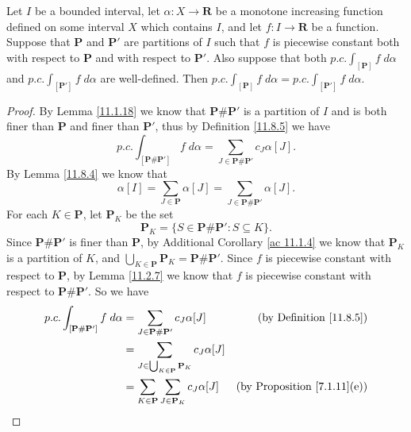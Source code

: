 \begin{additional corollary}\label{ac 11.8.4}
Let \(I\) be a bounded interval, let \(\alpha : X \to \mathbf{R}\) be a monotone increasing function defined on some interval \(X\) which contains \(I\), and let \(f : I \to \mathbf{R}\) be a function.
Suppose that \(\mathbf{P}\) and \(\mathbf{P}'\) are partitions of \(I\) such that \(f\) is piecewise constant both with respect to \(\mathbf{P}\) and with respect to \(\mathbf{P}'\).
Also suppose that both \(p.c. \int_{[\mathbf{P}]} f \; d \alpha\) and \(p.c. \int_{[\mathbf{P}']} f \; d \alpha\) are well-defined.
Then \(p.c. \int_{[\mathbf{P}]} f \; d \alpha = p.c. \int_{[\mathbf{P}']} f \; d \alpha\).
\end{additional corollary}

\begin{proof}
    By Lemma \ref{11.1.18} we know that \(\mathbf{P} \# \mathbf{P}'\) is a partition of \(I\) and is both finer than \(\mathbf{P}\) and finer than \(\mathbf{P}'\), thus by Definition \ref{11.8.5} we have
    \[
        p.c. \int_{[\mathbf{P} \# \mathbf{P}']} f \; d \alpha = \sum_{J \in \mathbf{P} \# \mathbf{P}'} c_J \alpha[J].
    \]
    By Lemma \ref{11.8.4} we know that
    \[
        \alpha[I] = \sum_{J \in \mathbf{P}} \alpha[J] = \sum_{J \in \mathbf{P} \# \mathbf{P}'} \alpha[J].
    \]
    For each \(K \in \mathbf{P}\), let \(\mathbf{P}_K\) be the set
    \[
        \mathbf{P}_K = \{S \in \mathbf{P} \# \mathbf{P}' : S \subseteq K\}.
    \]
    Since \(\mathbf{P} \# \mathbf{P}'\) is finer than \(\mathbf{P}\), by Additional Corollary \ref{ac 11.1.4} we know that \(\mathbf{P}_K\) is a partition of \(K\), and \(\bigcup_{K \in \mathbf{P}} \mathbf{P}_K = \mathbf{P} \# \mathbf{P}'\).
    Since \(f\) is piecewise constant with respect to \(\mathbf{P}\), by Lemma \ref{11.2.7} we know that \(f\) is piecewise constant with respect to \(\mathbf{P} \# \mathbf{P}'\).
    So we have
    \begin{align*}
        p.c. \int_{[\mathbf{P} \# \mathbf{P}']} f \; d \alpha & = \sum_{J \in \mathbf{P} \# \mathbf{P}'} c_J \alpha[J]                        & \text{(by Definition \ref{11.8.5})}     \\
                                                              & = \sum_{J \in \bigcup_{K \in \mathbf{P}} \mathbf{P}_K} c_J \alpha[J]                                                    \\
                                                              & = \sum_{K \in \mathbf{P}} \sum_{J \in \mathbf{P}_K} c_J \alpha[J]             & \text{(by Proposition \ref{7.1.11}(e))} \\

\end{align*}
\end{proof}
